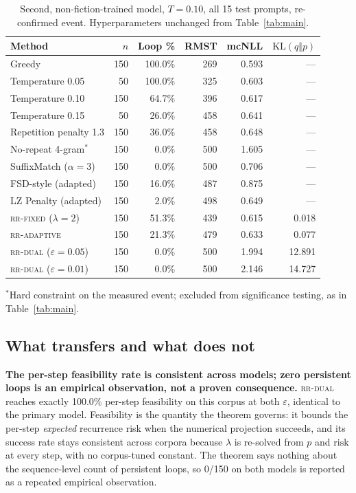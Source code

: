 \documentclass[11pt]{article}
\newcommand{\risk}{\mathrm{risk}}
\newcommand{\KL}{\mathrm{KL}}
\begin{document}
\begin{table}[ht]
\centering
\caption{Second, non-fiction-trained model, $T{=}0.10$, all 15 test prompts, re-confirmed event. Hyperparameters unchanged from Table~\ref{tab:main}.}
\label{tab:generalization}
\begin{tabular}{@{}lrrrrr@{}}
\toprule
Method & $n$ & Loop \% & RMST & mcNLL & $\KL(q\Vert p)$ \\
\midrule
Greedy                      & 150 & 100.0\% & 269   & 0.593 & --- \\
Temperature 0.05             & 50  & 100.0\% & 325   & 0.603 & --- \\
Temperature 0.10             & 150 & 64.7\%  & 396   & 0.617 & --- \\
Temperature 0.15             & 50  & 26.0\%  & 458   & 0.641 & --- \\
Repetition penalty 1.3        & 150 & 36.0\%  & 458   & 0.648 & --- \\
No-repeat 4-gram$^{*}$       & 150 & 0.0\%   & 500   & 1.605 & --- \\
SuffixMatch ($\alpha{=}3$)    & 150 & 0.0\%   & 500   & 0.706 & --- \\
FSD-style (adapted)          & 150 & 16.0\%  & 487   & 0.875 & --- \\
LZ Penalty (adapted)        & 150 & 2.0\%   & 498   & 0.649 & --- \\
\textsc{rr-fixed} ($\lambda{=}2$)   & 150 & 51.3\%  & 439   & 0.615 & 0.018 \\
\textsc{rr-adaptive}          & 150 & 21.3\%  & 479   & 0.633 & 0.077 \\
\textsc{rr-dual} ($\varepsilon{=}0.05$) & 150 & 0.0\% & 500 & 1.994 & 12.891 \\
\textsc{rr-dual} ($\varepsilon{=}0.01$) & 150 & 0.0\% & 500 & 2.146 & 14.727 \\
\bottomrule
\end{tabular}

\vspace{4pt}
{\footnotesize $^{*}$Hard constraint on the measured event; excluded from significance testing, as in Table~\ref{tab:main}.}
\end{table}


\subsection{What transfers and what does not}
\textbf{The per-step feasibility rate is consistent across models; zero persistent loops is an empirical observation, not a proven consequence.} \textsc{rr-dual} reaches exactly 100.0\% per-step feasibility on this corpus at both $\varepsilon$, identical to the primary model. Feasibility is the quantity the theorem governs: it bounds the per-step \emph{expected} recurrence risk when the numerical projection succeeds, and its success rate stays consistent across corpora because $\lambda$ is re-solved from $p$ and $\risk$ at every step, with no corpus-tuned constant. The theorem says nothing about the sequence-level count of persistent loops, so 0/150 on both models is reported as a repeated empirical observation.
\end{document}
